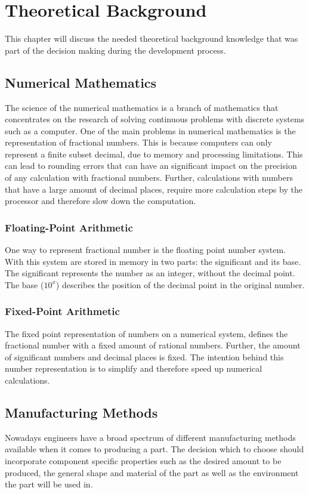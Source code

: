 \chapter{Theoretical Background}
\label{theoretical_background}

This chapter will discuss the needed theoretical background knowledge that was part of the decision making during the development process.

\section{Numerical Mathematics}
The science of the numerical mathematics is a branch of mathematics that concentrates on the research of solving continuous problems with discrete systems such as a computer. 
One of the main problems in numerical mathematics is the representation of fractional numbers. This is because computers can only represent a finite subset decimal, due to memory and processing limitations.
This can lead to rounding errors that can have an significant impact on the precision of any calculation with fractional numbers.
Further, calculations with numbers that have a large amount of decimal places, require more calculation steps by the processor and therefore slow down the computation.\cite{quarteroni2007numerical}

\subsection{Floating-Point Arithmetic}
One way to represent fractional number is the floating point number system. With this system are stored in memory in two parts: the significant and its base. The significant represents the number as an integer, without the decimal point.
The base ($10^x$) describes the position of the decimal point in the original number.\cite{quarteroni2007numerical}

\subsection{Fixed-Point Arithmetic}
The fixed point representation of numbers on a numerical system, defines the fractional number with a fixed amount of rational numbers. Further, the amount of significant numbers and decimal places is fixed. 
The intention behind this number representation is to simplify and therefore speed up numerical calculations.\cite{quarteroni2007numerical}

\section{Manufacturing Methods}
Nowadays engineers have a broad spectrum of different manufacturing methods available when it comes to producing a part. 
The decision which to choose should incorporate component specific properties such as the desired amount to be produced, 
the general shape and material of the part as well as the environment the part will be used in.

